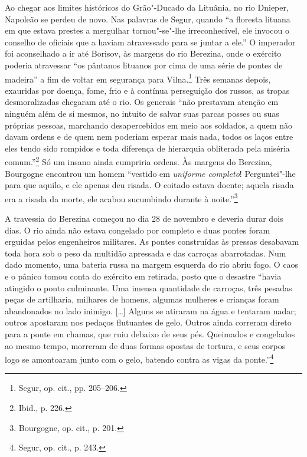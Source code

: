 Ao chegar aos limites históricos do Grão"-Ducado da Lituânia, no rio
Dnieper, Napoleão se perdeu de novo. Nas palavras de Segur, quando ``a
floresta lituana em que estava prestes a mergulhar tornou"-se"-lhe
irreconhecível, ele invocou o conselho de oficiais que a haviam
atravessado para se juntar a ele.'' O imperador foi aconselhado a ir até
Borisov, às margens do rio Berezina, onde o exército poderia atravessar
``os pântanos lituanos por cima de uma série de pontes de madeira'' a
fim de voltar em segurança para Vilna.\footnote{Segur, op. cit., pp. 205--206.} Três semanas depois, exauridas por doença, fome, frio e à contínua perseguição dos russos, as tropas desmoralizadas chegaram até o
rio. Os generais ``não prestavam atenção em ninguém além de si mesmos,
no intuito de salvar suas parcas posses ou suas próprias pessoas,
marchando desapercebidos em meio aos soldados, a quem não davam ordens e
de quem nem poderiam esperar mais nada, todos os laços entre eles tendo
sido rompidos e toda diferença de hierarquia obliterada pela miséria
comum.''\footnote{Ibid., p. 226.} Só um insano ainda cumpriria ordens.
Às margens do Berezina, Bourgogne encontrou um homem ``vestido em
\textit{uniforme completo}! Perguntei"-lhe para que aquilo, e ele apenas
deu risada. O coitado estava doente; aquela risada era a risada da
morte, ele acabou sucumbindo durante à noite.''\footnote{Bourgogne, op. cit., p. 201.}

A travessia do Berezina começou no dia 28 de novembro e deveria durar
dois dias. O rio ainda não estava congelado por completo e duas pontes
foram erguidas pelos engenheiros militares. As pontes construídas às
pressas desabavam toda hora sob o peso da multidão apressada e das
carroças abarrotadas. Num dado momento, uma bateria russa na margem
esquerda do rio abriu fogo. O caos e o pânico tomou conta do exército em
retirada, posto que o desastre ``havia atingido o ponto culminante. Uma
imensa quantidade de carroças, três pesadas peças de artilharia,
milhares de homens, algumas mulheres e crianças foram abandonados no
lado inimigo. [\ldots{}] Alguns se atiraram na água e tentaram nadar;
outros apostaram nos pedaços flutuantes de gelo. Outros ainda correram
direto para a ponte em chamas, que ruiu debaixo de seus pés. Queimados e
congelados ao mesmo tempo, morreram de duas formas opostas de tortura, e
seus corpos logo se amontoaram junto com o gelo, batendo contra as vigas
da ponte.''\footnote{Segur, op. cit., p. 243.}

